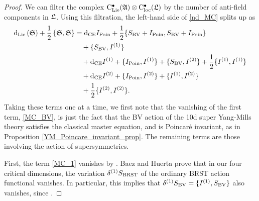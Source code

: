 \documentclass[10pt, oneside]{article}
\begin{document}
\begin{proof}
We can filter the complex ${\rm C}_{\rm Lie}^\bullet(\mathfrak{A}) \otimes {\rm C}_{\rm loc}^\bullet(\mathfrak L)$ by the number of anti-field components in $\mathfrak L$.  Using this filtration, the left-hand side of \ref{nd_MC} splits up as
\begin{align}
{\rm d}_{\rm Lie}  \left( \mathfrak S \right) + \frac{1}{2} \left\{ \mathfrak S , \mathfrak S \right\} &= {\rm d}_{\mathrm{CE}} I_{\mathrm{Poin}} + \frac 12 \{S_{\mathrm{BV}} + I_{\mathrm{Poin}}, S_{\mathrm{BV}} + I_{\mathrm{Poin}}\} \label{MC_BV}\\
&\quad + \{S_{\mathrm{BV}}, I^{(1)}\} \label{MC_1}\\
&\quad + {\rm d}_{\mathrm{CE}} I^{(1)} + \{I_{\mathrm{Poin}}, I^{(1)}\} + \{S_{\mathrm{BV}}, I^{(2)}\} + \frac 12 \{I^{(1)}, I^{(1)}\} \label{MC_2}\\
&\quad + {\rm d}_{\mathrm{CE}} I^{(2)} + \{I_{\mathrm{Poin}}, I^{(2)}\} + \{I^{(1)}, I^{(2)}\} \label{MC_3}\\
&\quad + \frac 12 \{I^{(2)}, I^{(2)}\}. \label{MC_4}
\end{align}
Taking these terms one at a time, we first note that the vanishing of the first term, \ref{MC_BV}, is just the fact that the BV action of the 10d super Yang-Mills theory  satisfies the classical master equation, and is Poincar\'e invariant, as in Proposition \ref{YM_Poincare_invariant_prop}. The remaining terms are those involving the action of supersymmetries.

First, the term \ref{MC_1} vanishes by \cite[Proposition 14]{BaezHuerta}.  Baez and Huerta prove that in our four critical dimensions, the variation $\delta^{(1)}S_{\mathrm{BRST}}$ of the ordinary BRST action functional vanishes.  In particular, this implies that $\delta^{(1)}S_{\mathrm{BV}} = \{I^{(1)}, S_{\mathrm{BV}}\}$ also vanishes, since .


\end{proof}
\end{document}
